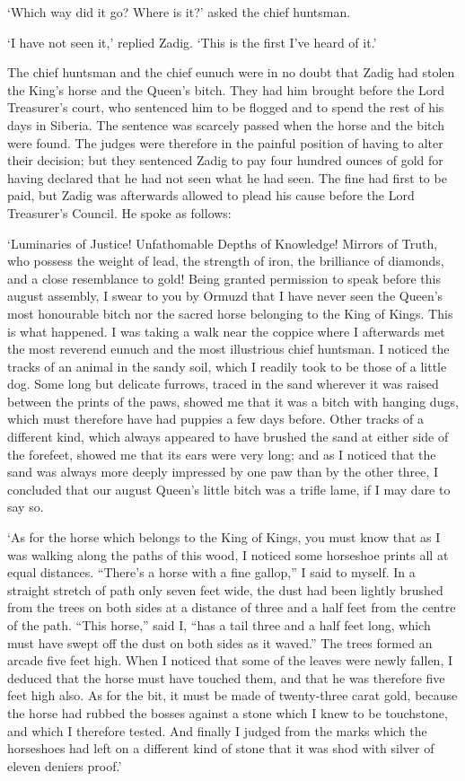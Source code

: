 \documentclass{article}
\begin{document}
\begin{center}
`Which way did it go? Where is it?' asked the chief huntsman. 

`I have not seen it,' replied Zadig. `This is the first I've heard of it.' 

The chief huntsman and the chief eunuch were in no doubt that Zadig had stolen 
the King's horse and the Queen's bitch. They had him brought before the Lord Treasurer's 
court, who sentenced him to be flogged and to spend the rest of his days in Siberia. 
The sentence was scarcely passed when the horse and the bitch were found. The judges 
were therefore in the painful position of having to alter their decision; but they 
sentenced Zadig to pay four hundred ounces of gold for having declared that he 
had not seen what he had seen. The fine had first to be paid, but Zadig was afterwards 
allowed to plead his cause before the Lord Treasurer's Council. He spoke as follows: 

`Luminaries of Justice! Unfathomable Depths of Knowledge! Mirrors of Truth, who 
possess the weight of lead, the strength of iron, the brilliance of diamonds, and 
a close resemblance to gold! Being granted permission to speak before this august 
assembly, I swear to you by Ormuzd that I have never seen the Queen's most honourable 
bitch nor the sacred horse belonging to the King of Kings. This is what happened. 
I was taking a walk near the coppice where I afterwards met the most reverend eunuch 
and the most illustrious chief huntsman. I noticed the tracks of an animal in the 
sandy soil, which I readily took to be those of a little dog. Some long but delicate 
furrows, traced in the sand wherever it was raised between the prints of the paws, 
showed me that it was a bitch with hanging dugs, which must therefore have had 
puppies a few days before. Other tracks of a different kind, which always appeared 
to have brushed the sand at either side of the forefeet, showed me that its ears 
were very long; and as I noticed that the sand was always more deeply impressed 
by one paw than by the other three, I concluded that our august Queen's little 
bitch was a trifle lame, if I may dare to say so. 

`As for the horse which belongs to the King of Kings, you must know that as I was 
walking along the paths of this wood, I noticed some horseshoe prints all at equal 
distances. ``There's a horse with a fine gallop,'' I said to myself. In a straight 
stretch of path only seven feet wide, the dust had been lightly brushed from the 
trees on both sides at a distance of three and a half feet from the centre of the 
path. ``This horse,'' said I, ``has a tail three and a half feet long, which must 
have swept off the dust on both sides as it waved.'' The trees formed an arcade 
five feet high. When I noticed that some of the leaves were newly fallen, I deduced 
that the horse must have touched them, and that he was therefore five feet high 
also. As for the bit, it must be made of twenty-three carat gold, because the horse 
had rubbed the bosses against a stone which I knew to be touchstone, and which 
I therefore tested. And finally I judged from the marks which the horseshoes had 
left on a different kind of stone that it was shod with silver of eleven deniers 
proof.' 


\end{center}
\end{document}
